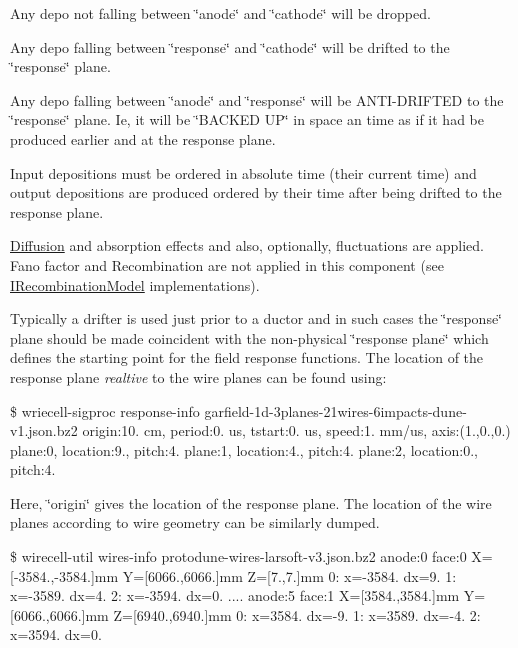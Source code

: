 Any depo not falling between \char`\"{}anode\char`\"{} and \char`\"{}cathode\char`\"{} will be dropped.

Any depo falling between \char`\"{}response\char`\"{} and \char`\"{}cathode\char`\"{} will be drifted to the \char`\"{}response\char`\"{} plane.

Any depo falling between \char`\"{}anode\char`\"{} and \char`\"{}response\char`\"{} will be A\+N\+T\+I-\/\+D\+R\+I\+F\+T\+ED to the \char`\"{}response\char`\"{} plane. Ie, it will be \char`\"{}\+B\+A\+C\+K\+E\+D U\+P\char`\"{} in space an time as if it had be produced earlier and at the response plane.

Input depositions must be ordered in absolute time (their current time) and output depositions are produced ordered by their time after being drifted to the response plane.

\hyperlink{class_wire_cell_1_1_diffusion}{Diffusion} and absorption effects and also, optionally, fluctuations are applied. Fano factor and Recombination are not applied in this component (see \hyperlink{class_wire_cell_1_1_i_recombination_model}{I\+Recombination\+Model} implementations).

Typically a drifter is used just prior to a ductor and in such cases the \char`\"{}response\char`\"{} plane should be made coincident with the non-\/physical \char`\"{}response plane\char`\"{} which defines the starting point for the field response functions. The location of the response plane {\itshape realtive} to the wire planes can be found using\+:

\$ wriecell-\/sigproc response-\/info garfield-\/1d-\/3planes-\/21wires-\/6impacts-\/dune-\/v1.\+json.\+bz2 origin\+:10. cm, period\+:0. us, tstart\+:0. us, speed\+:1. mm/us, axis\+:(1.,0.,0.) plane\+:0, location\+:9.\+4200mm, pitch\+:4.\+7100mm plane\+:1, location\+:4.\+7100mm, pitch\+:4.\+7100mm plane\+:2, location\+:0.\+0000mm, pitch\+:4.\+7100mm

Here, \char`\"{}origin\char`\"{} gives the location of the response plane. The location of the wire planes according to wire geometry can be similarly dumped.

\$ wirecell-\/util wires-\/info protodune-\/wires-\/larsoft-\/v3.\+json.\+bz2 anode\+:0 face\+:0 X=\mbox{[}-\/3584.,-\/3584.\mbox{]}mm Y=\mbox{[}6066.,6066.\mbox{]}mm Z=\mbox{[}7.,7.\mbox{]}mm 0\+: x=-\/3584.\+63mm dx=9.\+5250mm 1\+: x=-\/3589.\+39mm dx=4.\+7620mm 2\+: x=-\/3594.\+16mm dx=0.\+0000mm .... anode\+:5 face\+:1 X=\mbox{[}3584.,3584.\mbox{]}mm Y=\mbox{[}6066.,6066.\mbox{]}mm Z=\mbox{[}6940.,6940.\mbox{]}mm 0\+: x=3584.\+63mm dx=-\/9.\+5250mm 1\+: x=3589.\+39mm dx=-\/4.\+7620mm 2\+: x=3594.\+16mm dx=0.\+0000mm

